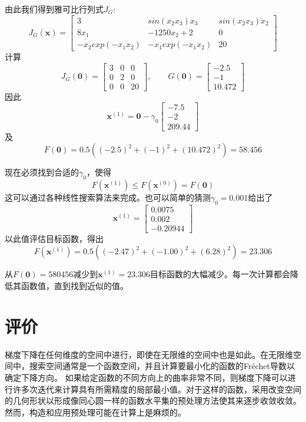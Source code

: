 \documentclass[12pt,a4paper]{article}
\begin{document}
由此我们得到雅可比行列式$J_G$:
\begin{equation}
	J_G(\mathbf x)=
	\left[\begin{array}{ccc} 3 & sin(x_2 x_3) x_{3} & sin(x_2 x_3) x_2 \\ 
		8 x_1 & -1250 x_2+2 & 0 \\ 
		-x_2exp(-x_1 x_2) & -x_1 exp (-x_1 x_2)& 20
\end{array}\right]
\end{equation}
计算
$$J_{G}(\mathbf{0})=\left[\begin{array}{ccc}{3} & {0} & {0} \\ {0} & {2} & {0} \\ {0} & {0} & {20}\end{array}\right], \qquad G(\mathbf{0})=\left[\begin{array}{c}{-2.5} \\ {-1} \\ {10.472}\end{array}\right]$$
因此
$$\mathbf{x}^{(1)}=\mathbf{0}-\gamma_{0}\left[\begin{array}{c}{-7.5} \\ {-2} \\ {209.44}\end{array}\right]$$
及
$$F(\mathbf 0)=0.5\left((-2.5)^{2}+(-1)^{2}+(10.472)^{2}\right)=58.456$$

现在必须找到合适的$\gamma_0$，使得
$$F\left(\mathbf{x}^{(1)}\right) \leq F\left(\mathbf{x}^{(0)}\right)=F(\mathbf{0})$$
这可以通过各种线性搜索算法来完成。也可以简单的猜测$\gamma_0=0.001$给出了
$$\mathbf{x}^{(1)}=\left[\begin{array}{c}{0.0075} \\ {0.002} \\ {-0.20944}\end{array}\right]$$
以此值评估目标函数，得出
$$F\left(\mathbf{x}^{(1)}\right)=0.5((-2.47)^2+(-1.00)^2+(6.28)^2)=23.306$$

从$F(\mathbf 0)=580456$减少到$\mathbf{x}^{(1)}=23.306$目标函数的大幅减少。每一次计算都会降低其函数值，直到找到近似的值。
\section{评价}
梯度下降在任何维度的空间中进行，即使在无限维的空间中也是如此。在无限维空间中，搜索空间通常是一个函数空间，并且计算要最小化的函数的Fréchet导数以确定下降方向。
如果给定函数的不同方向上的曲率非常不同，则梯度下降可以进行许多次迭代来计算具有所需精度的局部最小值。对于这样的函数，采用改变空间的几何形状以形成像同心圆一样的函数水平集的预处理方法使其来逐步收敛收敛。然而，构造和应用预处理可能在计算上是麻烦的。
\end{document}
